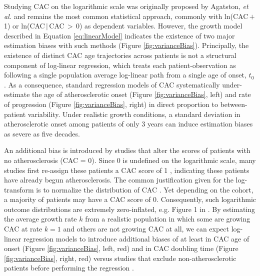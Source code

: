 \documentclass[aps,pre,twocolumn,twoside,tightenlines,groupedaddress,amsmath,amssymb,nobibnotes,final,showkeys,letterpaper]{revtex4-2}
\begin{document}
Studying CAC on the logarithmic scale was originally proposed by Agatston, \textit{et al.} \cite{agatston1990cac} and remains the most common statistical approach, commonly with ln(CAC\,$+$\,1) or ln(CAC\,$|$\,CAC\,$>$\,0) as dependent variables. However, the growth model described in Equation \ref{eq:linearModel} indicates the existence of two major estimation biases with such methods (Figure \ref{fig:varianceBias}). Principally, the existence of distinct CAC age trajectories across patients is not a structural component of log-linear regression, which treats each patient-observation as following a single population average log-linear path from a single age of onset, $t_0$. As a consequence, standard regression models of CAC systematically under-estimate the age of atherosclerotic onset (Figure \ref{fig:varianceBias}, left) and rate of progression (Figure \ref{fig:varianceBias}, right) in direct proportion to between-patient variability. Under realistic growth conditions, a standard deviation in atherosclerotic onset among patients of only 3 years can induce estimation biases as severe as five decades.

An additional bias is introduced by studies that alter the scores of patients with no atherosclerosis (CAC = 0). Since 0 is undefined on the logarithmic scale, many studies first re-assign these patients a CAC score of 1 \cite{oei2004risk, arad2005events, budoff2006ethnic, schmermund2007comparison, detrano2008predictor, moehlenkamp2011inflammation, wong2011abdominal, leening2012elderly, hughesaustin2016relationship, mcclelland2015prediction, blaha2016improving}, indicating these patients have already begun atherosclerosis. The common justification given for the log-transform is to normalize the distribution of CAC \cite{agatston1990cac, budoff2006ethnic, schmermund2007comparison, folsom2008imt}. Yet depending on the cohort, a majority of patients may have a CAC score of 0. Consequently, such logarithmic outcome distributions are extremely zero-inflated, e.g. Figure 1 in \cite{schmermund2007comparison}. By estimating the average growth rate $k$ from a realistic population in which some are growing CAC at rate $k = 1$ and others are not growing CAC at all, we can expect log-linear regression models to introduce additional biases of at least \biasDiffOnset{} in CAC age of onset (Figure \ref{fig:varianceBias}, left, red) and \biasDiffDoubling{} in CAC doubling time (Figure \ref{fig:varianceBias}, right, red) versus studies that exclude non-atherosclerotic patients before performing the regression \cite{bild2005ethnic, mcclelland2006mesa, bielak2008amish, budoff2013progression, criqui2014density, kaplan2017tsimane}.
\end{document}
